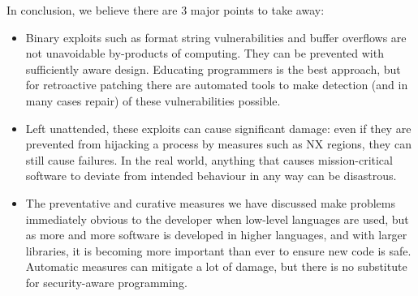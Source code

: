 In conclusion, we believe there are 3 major points to take away: 

\begin{itemize} 

\item Binary exploits such as format string vulnerabilities and buffer overflows are not unavoidable by-products of
computing. They can be prevented with sufficiently aware design. Educating programmers is the best approach, but for
retroactive patching there are automated tools to make detection (and in many cases repair) of these vulnerabilities
possible.

\item Left unattended, these exploits can cause significant damage: even if they are prevented from hijacking a process
by measures such as NX regions, they can still cause failures. In the real world, anything that causes mission-critical
software to deviate from intended behaviour in any way can be disastrous.

\item The preventative and curative measures we have discussed make problems immediately obvious to the developer when
low-level languages are used, but as more and more software is developed in higher languages, and with larger libraries,
it is becoming more important than ever to ensure new code is safe. Automatic measures can mitigate a lot of damage,
but there is no substitute for security-aware programming.

\end{itemize}

